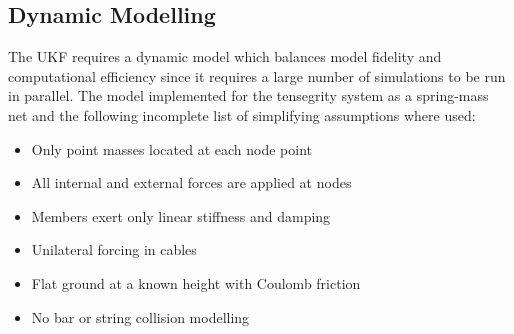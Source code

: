 {\subsection{Dynamic Modelling} 
\label{sec:dynamic_modeling_sb}

The UKF requires a dynamic model which balances model fidelity and computational efficiency since it requires a large number of simulations to be run in parallel. 
The model implemented for the tensegrity system as a spring-mass net and the following incomplete list of simplifying assumptions where used:
\begin{itemize}
  \item Only point masses located at each node point
  \item All internal and external forces are applied at nodes
  \item Members exert only linear stiffness and damping
  \item Unilateral forcing in cables
  \item Flat ground at a known height with Coulomb friction
  \item No bar or string collision modelling
\end{itemize}

}
